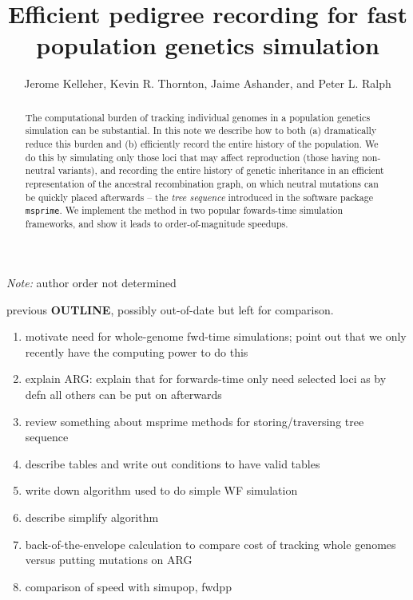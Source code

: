 \documentclass{article}
\newcommand{\msprime}{\texttt{msprime}}
\begin{document}
\title{Efficient pedigree recording for fast population genetics simulation}
\author{Jerome Kelleher,
        Kevin R. Thornton,
        Jaime Ashander, and
        Peter L. Ralph}
\maketitle

\emph{Note:} author order not determined


\begin{abstract}
    The computational burden of tracking individual genomes 
    in a population genetics simulation can be substantial.
    In this note we describe how to both (a) dramatically reduce this burden and
    (b) efficiently record the entire history of the population.
    We do this by simulating only those loci that may affect reproduction (those having non-neutral variants),
    and recording the entire history of genetic inheritance in an efficient representation of the ancestral recombination graph,
    on which neutral mutations can be quickly placed afterwards --
    the \emph{tree sequence} introduced in the software package \msprime.
    We implement the method in two popular fowards-time simulation frameworks,
    and show it leads to order-of-magnitude speedups.
\end{abstract}


previous \textbf{OUTLINE}, possibly out-of-date but left for comparison.
\begin{enumerate}
    \item motivate need for whole-genome fwd-time simulations; point out that we only recently have the computing power to do this
    \item explain ARG: explain that for forwards-time only need selected loci as by defn all others can be put on afterwards
    \item review something about msprime methods for storing/traversing tree sequence
    \item describe tables and write out conditions to have valid tables
    \item write down algorithm used to do simple WF simulation
    \item describe simplify algorithm
    \item back-of-the-envelope calculation to compare cost of tracking whole genomes versus putting mutations on ARG
    \item comparison of speed with simupop, fwdpp
\end{enumerate}
\end{document}
